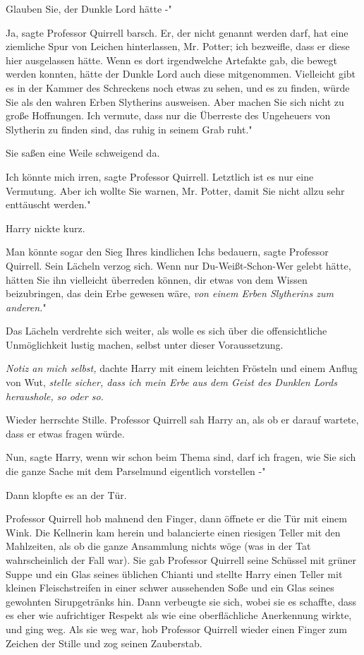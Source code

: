 \glqq Glauben Sie, der Dunkle Lord hätte -"

\glqq Ja\grqq{}, sagte Professor Quirrell barsch. \glqq Er, der nicht genannt
werden darf, hat eine ziemliche Spur von Leichen hinterlassen, Mr. Potter; ich
bezweifle, dass er diese hier ausgelassen hätte. Wenn es dort irgendwelche
Artefakte gab, die bewegt werden konnten, hätte der Dunkle Lord auch diese
mitgenommen. Vielleicht gibt es in der Kammer des Schreckens noch etwas zu
sehen, und es zu finden, würde Sie als den wahren Erben Slytherins ausweisen.
Aber machen Sie sich nicht zu große Hoffnungen. Ich vermute, dass nur die
Überreste des Ungeheuers von Slytherin zu finden sind, das ruhig in seinem Grab
ruht."

Sie saßen eine Weile schweigend da.

\glqq Ich könnte mich irren\grqq{}, sagte Professor Quirrell. \glqq Letztlich
ist es nur eine Vermutung. Aber ich wollte Sie warnen, Mr. Potter, damit Sie
nicht allzu sehr enttäuscht werden."

Harry nickte kurz.

\glqq Man könnte sogar den Sieg Ihres kindlichen Ichs bedauern\grqq{}, sagte
Professor Quirrell. Sein Lächeln verzog sich. \glqq Wenn nur Du-Weißt-Schon-Wer
gelebt hätte, hätten Sie ihn vielleicht überreden können, dir etwas von dem
Wissen beizubringen, das dein Erbe gewesen wäre, \emph{von einem Erben
Slytherins zum anderen.}"

Das Lächeln verdrehte sich weiter, als wolle es sich über die offensichtliche
Unmöglichkeit lustig machen, selbst unter dieser Voraussetzung.

\emph{Notiz an mich selbst,} dachte Harry mit einem leichten Frösteln und einem
Anflug von Wut,\emph{ stelle sicher, dass ich mein Erbe aus dem Geist des
Dunklen Lords heraushole, so oder so.}

Wieder herrschte Stille. Professor Quirrell sah Harry an, als ob er darauf
wartete, dass er etwas fragen würde.

\glqq Nun\grqq{}, sagte Harry, \glqq wenn wir schon beim Thema sind, darf ich
fragen, wie Sie sich die ganze Sache mit dem Parselmund eigentlich vorstellen -"

Dann klopfte es an der Tür.

Professor Quirrell hob mahnend den Finger, dann öffnete er die Tür mit einem
Wink. Die Kellnerin kam herein und balancierte einen riesigen Teller mit den
Mahlzeiten, als ob die ganze Ansammlung nichts wöge (was in der Tat
wahrscheinlich der Fall war). Sie gab Professor Quirrell seine Schüssel mit
grüner Suppe und ein Glas seines üblichen Chianti und stellte Harry einen Teller
mit kleinen Fleischstreifen in einer schwer aussehenden Soße und ein Glas seines
gewohnten Sirupgetränks hin. Dann verbeugte sie sich, wobei sie es schaffte,
dass es eher wie aufrichtiger Respekt als wie eine oberflächliche Anerkennung
wirkte, und ging weg. Als sie weg war, hob Professor Quirrell wieder einen
Finger zum Zeichen der Stille und zog seinen Zauberstab.

